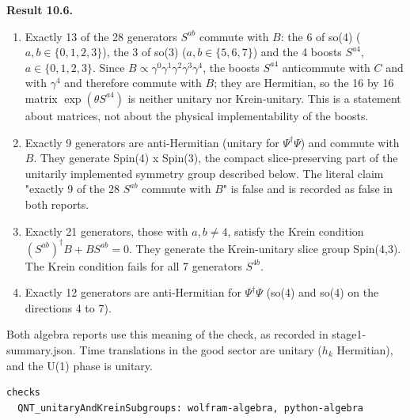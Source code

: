\documentclass[11pt]{article}
\begin{document}
\textbf{Result 10.6.}

\begin{enumerate}
\item Exactly 13 of the 28 generators $S^{ab}$ commute with $B$: the 6 of so(4) ($a,b\in\{0,1,2,3\}$), the 3 of so(3) ($a,b\in\{5,6,7\}$) and the 4 boosts $S^{a4}$, $a\in\{0,1,2,3\}$. Since $B\propto\gamma^0\gamma^1\gamma^2\gamma^3\gamma^4$, the boosts $S^{a4}$ anticommute with $C$ and with $\gamma^4$ and therefore commute with $B$; they are Hermitian, so the 16 by 16 matrix $\exp(\theta S^{a4})$ is neither unitary nor Krein-unitary. This is a statement about matrices, not about the physical implementability of the boosts.
\item Exactly 9 generators are anti-Hermitian (unitary for $\Psi^\dagger\Psi$) and commute with $B$. They generate Spin(4) x Spin(3), the compact slice-preserving part of the unitarily implemented symmetry group described below. The literal claim "exactly 9 of the 28 $S^{ab}$ commute with $B$" is false and is recorded as false in both reports.
\item Exactly 21 generators, those with $a,b\ne4$, satisfy the Krein condition $(S^{ab})^\dagger B+BS^{ab}=0$. They generate the Krein-unitary slice group Spin(4,3). The Krein condition fails for all 7 generators $S^{4b}$.
\item Exactly 12 generators are anti-Hermitian for $\Psi^\dagger\Psi$ (so(4) and so(4) on the directions 4 to 7).
\end{enumerate}

Both algebra reports use this meaning of the check, as recorded in stage1-summary.json. Time translations in the good sector are unitary ($h_k$ Hermitian), and the U(1) phase is unitary.

\begin{Verbatim}[fontsize=\small]
checks
  QNT_unitaryAndKreinSubgroups: wolfram-algebra, python-algebra
\end{Verbatim}
\end{document}
